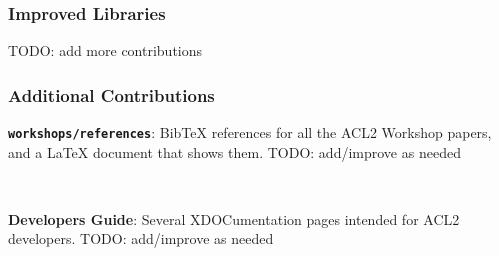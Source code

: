 \documentclass{beamer}
\newcommand{\code}[1]{\texttt{#1}}
\newcommand{\bookpath}[1]{\textbf{\code{#1}}}
\newcommand{\implibtitle}{\frametitle{Improved Libraries}}
\begin{document}
\begin{frame}

\implibtitle

TODO: add more contributions

\end{frame}


\begin{frame}

\frametitle{Additional Contributions}

\bookpath{workshops/references}:
BibTeX references for all the ACL2 Workshop papers,
and a LaTeX document that shows them.
TODO: add/improve as needed

\

\textbf{Developers Guide}:
Several XDOCumentation pages intended for ACL2 developers.
TODO: add/improve as needed

\end{frame}

\end{document}
